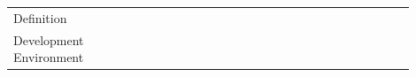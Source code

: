 \documentclass[english, 12pt, a4paper, sci, utf8, a-1b, online]{aaltothesis}
\begin{document}
{\begin{center}
\begin{longtable}{p{0.3\linewidth}p{0.6\linewidth}}
      Definition                        & \textcite{how-i-missed-it-before} \newline \textcite{effective-developer-experience} \newline \textcite{what-is-api-developer-experience-and-why-it-matters} \newline \textcite{what-is-developer-experience-everydeveloper} \newline \textcite{what-exactly-is-developer-experience}                                                                                                                                                                                                                                                                                                                                                                                                                                                                                                                                                           \\
      Development Environment           & \textcite{how-i-missed-it-before} \newline \textcite{workflows-for-the-new-developer-experience}                                                                                                                                                                                                                                                                                                                                                                                                                                                                                                                                                                                                                                                                                                                                                \\

\end{longtable}
\end{center}}
\end{document}
